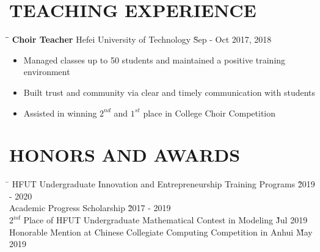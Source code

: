 \documentclass{res}
\begin{document}
\begin{resume}
\vspace{-0.12in}
\section{TEACHING EXPERIENCE}
    \vspace{-0.1in}	
    \begin{tabbing}
    \hspace{2.3in}\= \hspace{2.6in}\= \kill %
    {\bf Choir Teacher} \> Hefei University of Technology     \` Sep - Oct 2017, 2018\\
    \end{tabbing}\vspace{-20pt}      %
    \begin{itemize} \itemsep -2pt %
    \item Managed classes up to 50 students and maintained a positive training environment  
    \item Built trust and community via clear and timely communication with students  
    \item Assisted in winning $2^{nd}$ and $1^{st}$ place in College Choir Competition
    \end{itemize}

\vspace{-0.15in}	    
\section{HONORS AND AWARDS}  
    \vspace{-0.1in}	
    \begin{tabbing}
    \hspace{5in}\= \kill %
    HFUT Undergraduate Innovation and Entrepreneurship Training Programs \` 2019 - 2020 \\
    Academic Progress Scholarship \` 2017 - 2019  \\
    $2^{nd}$ Place of HFUT Undergraduate Mathematical Contest in Modeling \` Jul 2019 \\
    Honorable Mention at Chinese Collegiate Computing Competition in Anhui \` May 2019 
    \end{tabbing}\vspace{-20pt}      %
   
\vspace{+0.05in}	

\end{resume}
\end{document}
